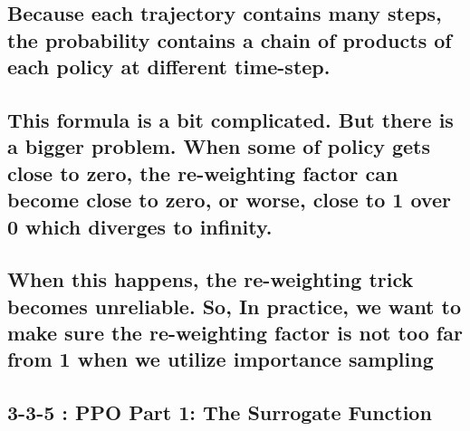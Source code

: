 \documentclass[11pt]{article}
\begin{document}
    \hypertarget{because-each-trajectory-contains-many-steps-the-probability-contains-a-chain-of-products-of-each-policy-at-different-time-step.}{%
\subsection{Because each trajectory contains many steps, the probability
contains a chain of products of each policy at different
time-step.}\label{because-each-trajectory-contains-many-steps-the-probability-contains-a-chain-of-products-of-each-policy-at-different-time-step.}}

\hypertarget{this-formula-is-a-bit-complicated.-but-there-is-a-bigger-problem.-when-some-of-policy-gets-close-to-zero-the-re-weighting-factor-can-become-close-to-zero-or-worse-close-to-1-over-0-which-diverges-to-infinity.}{%
\subsection{This formula is a bit complicated. But there is a bigger
problem. When some of policy gets close to zero, the re-weighting factor
can become close to zero, or worse, close to 1 over 0 which diverges to
infinity.}\label{this-formula-is-a-bit-complicated.-but-there-is-a-bigger-problem.-when-some-of-policy-gets-close-to-zero-the-re-weighting-factor-can-become-close-to-zero-or-worse-close-to-1-over-0-which-diverges-to-infinity.}}

\hypertarget{when-this-happens-the-re-weighting-trick-becomes-unreliable.-so-in-practice-we-want-to-make-sure-the-re-weighting-factor-is-not-too-far-from-1-when-we-utilize-importance-sampling}{%
\subsection{When this happens, the re-weighting trick becomes
unreliable. So, In practice, we want to make sure the re-weighting
factor is not too far from 1 when we utilize importance
sampling}\label{when-this-happens-the-re-weighting-trick-becomes-unreliable.-so-in-practice-we-want-to-make-sure-the-re-weighting-factor-is-not-too-far-from-1-when-we-utilize-importance-sampling}}

    \hypertarget{ppo-part-1-the-surrogate-function}{%
\subsection{3-3-5 : PPO Part 1: The Surrogate
Function}\label{ppo-part-1-the-surrogate-function}}
\end{document}
